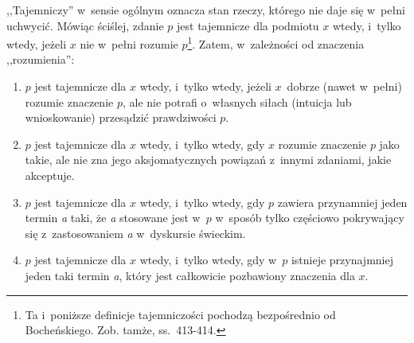 \begin{defin}[Tajemnica]
,,Tajemniczy'' w~sensie ogólnym oznacza stan rzeczy, którego nie daje się w~pełni uchwycić. Mówiąc ściślej, zdanie $p$ jest tajemnicze dla podmiotu $x$ wtedy, i~tylko wtedy, jeżeli $x$ nie w~pełni rozumie $p$\footnote{Ta i~poniższe definicje tajemniczości pochodzą bezpośrednio od Bocheńskiego. Zob. tamże, ss.~413-414.}. Zatem, w~zależności od znaczenia ,,rozumienia'':

\begin{enumerate}[label = (\arabic*)]
\item $p$ jest tajemnicze dla $x$ wtedy, i~tylko wtedy, jeżeli $x$~dobrze (nawet w~pełni) rozumie znaczenie $p$, ale nie potrafi o~własnych siłach (intuicja lub wnioskowanie) przesądzić prawdziwości $p$.
\item $p$ jest tajemnicze dla $x$ wtedy, i~tylko wtedy, gdy $x$ rozumie znaczenie $p$ jako takie, ale nie zna jego aksjomatycznych powiązań z~innymi zdaniami, jakie akceptuje.
\item $p$ jest tajemnicze dla $x$ wtedy, i~tylko wtedy, gdy $p$ zawiera przynamniej jeden termin \textit{a} taki, że \textit{a} stosowane jest w~$p$ w~sposób tylko częściowo pokrywający się z~zastosowaniem \textit{a} w~dyskursie świeckim.
\item $p$ jest tajemnicze dla $x$ wtedy, i~tylko wtedy, gdy w~$p$ istnieje przynajmniej jeden taki termin \textit{a}, który jest całkowicie pozbawiony znaczenia dla $x$.
\end{enumerate}
\end{defin}

